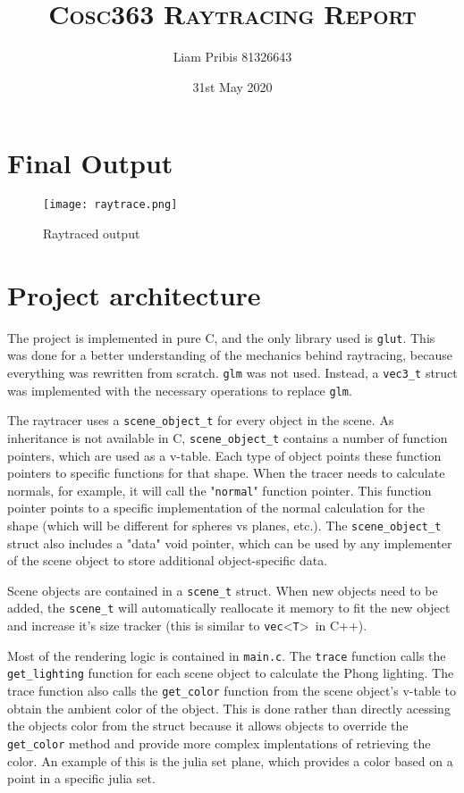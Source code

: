 \documentclass[11pt]{article}
\title{\fontsize{25}{40}\selectfont\textsc{Cosc363 Raytracing Report}}
\author{\Large Liam Pribis 81326643}
\date{\Large 31st May 2020}
\begin{document}
\maketitle
\thispagestyle{empty}
\newpage
\setcounter{page}{1}

\section{Final Output}

\begin{figure}[H]
    \centering
    \texttt{[image: raytrace.png]}
    \caption{Raytraced output}
    \label{fig:final}
\end{figure}

\section{Project architecture}
The project is implemented in pure C, and the only library used is \verb|glut|. This was done for a better understanding of the mechanics behind raytracing, because everything was rewritten from scratch. \verb|glm| was not used. Instead, a \verb|vec3_t| struct was implemented with the necessary operations to replace \verb|glm|.

The raytracer uses a \verb|scene_object_t| for every object in the scene. As inheritance is not available in C, \verb|scene_object_t| contains a number of function pointers, which are used as a v-table. Each type of object points these function pointers to specific functions for that shape. When the tracer needs to calculate normals, for example, it will call the "\verb|normal|" function pointer. This function pointer points to a specific implementation of the normal calculation for the shape (which will be different for spheres vs planes, etc.). The \verb|scene_object_t| struct also includes a "data" void pointer, which can be used by any implementer of the scene object to store additional object-specific data.

Scene objects are contained in a \verb|scene_t| struct. When new objects need to be added, the \verb|scene_t| will automatically reallocate it memory to fit the new object and increase it's size tracker (this is similar to \verb|vec|\textless \verb|T|\textgreater \ in C++).

Most of the rendering logic is contained in \verb|main.c|. The \verb|trace| function calls the \verb|get_lighting| function for each scene object to calculate the Phong lighting. The trace function also calls the \verb|get_color| function from the scene object's v-table to obtain the ambient color of the object. This is done rather than directly acessing the objects color from the struct because it allows objects to override the \verb|get_color| method and provide more complex implentations of retrieving the color. An example of this is the julia set plane, which provides a color based on a point in a specific julia set.
\end{document}
